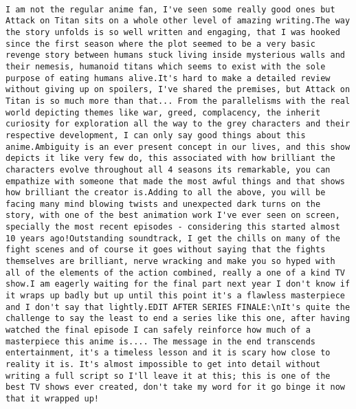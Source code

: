 \documentclass[
]{article}
\begin{document}
\begin{verbatim}
                                                                                                                                                                                                                                                                                                                                                                                                                                                                                                                                                                                                                                                                                                                                                                                                                                    I am not the regular anime fan, I've seen some really good ones but Attack on Titan sits on a whole other level of amazing writing.The way the story unfolds is so well written and engaging, that I was hooked since the first season where the plot seemed to be a very basic revenge story between humans stuck living inside mysterious walls and their nemesis, humanoid titans which seems to exist with the sole purpose of eating humans alive.It's hard to make a detailed review without giving up on spoilers, I've shared the premises, but Attack on Titan is so much more than that... From the parallelisms with the real world depicting themes like war, greed, complacency, the inherit curiosity for exploration all the way to the grey characters and their respective development, I can only say good things about this anime.Ambiguity is an ever present concept in our lives, and this show depicts it like very few do, this associated with how brilliant the characters evolve throughout all 4 seasons its remarkable, you can empathize with someone that made the most awful things and that shows how brilliant the creator is.Adding to all the above, you will be facing many mind blowing twists and unexpected dark turns on the story, with one of the best animation work I've ever seen on screen, specially the most recent episodes - considering this started almost 10 years ago!Outstanding soundtrack, I get the chills on many of the fight scenes and of course it goes without saying that the fights themselves are brilliant, nerve wracking and make you so hyped with all of the elements of the action combined, really a one of a kind TV show.I am eagerly waiting for the final part next year I don't know if it wraps up badly but up until this point it's a flawless masterpiece and I don't say that lightly.EDIT AFTER SERIES FINALE:\nIt's quite the challenge to say the least to end a series like this one, after having watched the final episode I can safely reinforce how much of a masterpiece this anime is.... The message in the end transcends entertainment, it's a timeless lesson and it is scary how close to reality it is. It's almost impossible to get into detail without writing a full script so I'll leave it at this; this is one of the best TV shows ever created, don't take my word for it go binge it now that it wrapped up!

\end{verbatim}
\end{document}
